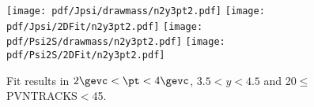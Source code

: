 \begin{figure}[H]
\begin{center}
\texttt{[image: pdf/Jpsi/drawmass/n2y3pt2.pdf]}
\texttt{[image: pdf/Jpsi/2DFit/n2y3pt2.pdf]}
\vspace*{-0.5cm}
\texttt{[image: pdf/Psi2S/drawmass/n2y3pt2.pdf]}
\texttt{[image: pdf/Psi2S/2DFit/n2y3pt2.pdf]}
\vspace*{-0.5cm}
\end{center}
\caption{Fit results in $2\gevc<\pt<4\gevc$, $3.5<y<4.5$ and 20$\leq$PVNTRACKS$<$45.}
\label{Fitn2y3pt2}
\end{figure}

